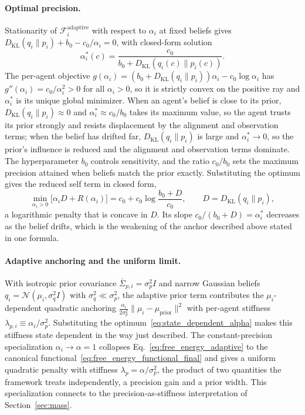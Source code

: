 \paragraph{Optimal precision.}
Stationarity of $\mathcal{F}_i^{\mathrm{adaptive}}$ with respect to $\alpha_i$ at fixed beliefs gives $D_{\mathrm{KL}}(q_i\|p_i) + b_0 - c_0/\alpha_i = 0$, with closed-form solution
\begin{equation}
\boxed{
\alpha_i^*(c) = \frac{c_0}{b_0 + D_{\mathrm{KL}}(q_i(c)\|p_i(c))}.
}
\label{eq:state_dependent_alpha}
\end{equation}
The per-agent objective $g(\alpha_i) = (b_0 + D_{\mathrm{KL}}(q_i\|p_i))\alpha_i - c_0\log\alpha_i$ has $g''(\alpha_i) = c_0/\alpha_i^2 > 0$ for all $\alpha_i > 0$, so it is strictly convex on the positive ray and $\alpha_i^*$ is its unique global minimizer. When an agent's belief is close to its prior, $D_{\mathrm{KL}}(q_i\|p_i) \approx 0$ and $\alpha_i^* \approx c_0/b_0$ takes its maximum value, so the agent trusts its prior strongly and resists displacement by the alignment and observation terms; when the belief has drifted far, $D_{\mathrm{KL}}(q_i\|p_i)$ is large and $\alpha_i^* \to 0$, so the prior's influence is reduced and the alignment and observation terms dominate. The hyperparameter $b_0$ controls sensitivity, and the ratio $c_0/b_0$ sets the maximum precision attained when beliefs match the prior exactly. Substituting the optimum gives the reduced self term in closed form,
\begin{equation}
\min_{\alpha_i>0}\big[\alpha_i D + R(\alpha_i)\big] = c_0 + c_0\log\frac{b_0 + D}{c_0},
\qquad D = D_{\mathrm{KL}}(q_i\|p_i),
\end{equation}
a logarithmic penalty that is concave in $D$. Its slope $c_0/(b_0+D)=\alpha_i^*$ decreases as the belief drifts, which is the weakening of the anchor described above stated in one formula.

\paragraph{Adaptive anchoring and the uniform limit.}
With isotropic prior covariance $\bar\Sigma_{p,i} = \sigma_p^2 I$ and narrow Gaussian beliefs $q_i = \mathcal{N}(\mu_i, \sigma_q^2 I)$ with $\sigma_q^2 \ll \sigma_p^2$, the adaptive prior term contributes the $\mu_i$-dependent quadratic anchoring $\frac{\alpha_i}{2\sigma_p^2}\|\mu_i - \mu_{\mathrm{prior}}\|^2$ with per-agent stiffness $\lambda_{p,i} \equiv \alpha_i/\sigma_p^2$. Substituting the optimum~\eqref{eq:state_dependent_alpha} makes this stiffness state dependent in the way just described. The constant-precision specialization $\alpha_i \to \alpha = 1$ collapses Eq.~\eqref{eq:free_energy_adaptive} to the canonical functional~\eqref{eq:free_energy_functional_final} and gives a uniform quadratic penalty with stiffness $\lambda_p = \alpha/\sigma_p^2$, the product of two quantities the framework treats independently, a precision gain and a prior width. This specialization connects to the precision-as-stiffness interpretation of Section~\ref{sec:mass}.

